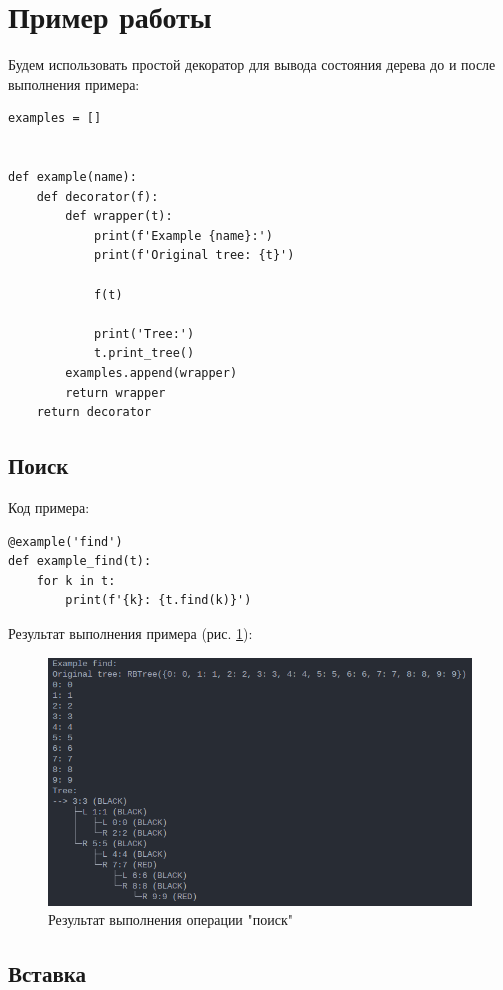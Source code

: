 \section{Пример работы}

Будем использовать простой декоратор
для вывода состояния дерева до
и после выполнения примера:

\begin{lstlisting}
examples = []


def example(name):
    def decorator(f):
        def wrapper(t):
            print(f'Example {name}:')
            print(f'Original tree: {t}')

            f(t)

            print('Tree:')
            t.print_tree()
        examples.append(wrapper)
        return wrapper
    return decorator
\end{lstlisting}

\subsection{Поиск}

Код примера:

\begin{lstlisting}
@example('find')
def example_find(t):
    for k in t:
        print(f'{k}: {t.find(k)}')
\end{lstlisting}

Результат выполнения примера (рис. \ref{fig:find}):

\begin{figure}[H]
    \centering
    \includegraphics[width=0.85\linewidth]{photo/example_find}
    \caption{Результат выполнения операции "поиск"}
    \label{fig:find}
\end{figure}

\subsection{Вставка}

